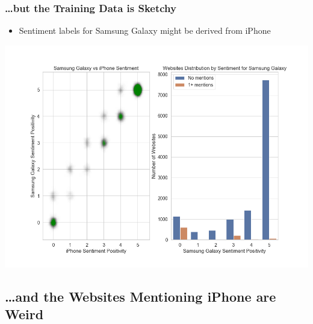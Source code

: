 \documentclass[10pt]{beamer}
\begin{document}
\begin{frame}
\frametitle{\ldots but the Training Data is Sketchy}

\begin{itemize}
    \item Sentiment labels for Samsung Galaxy might be derived from iPhone
\end{itemize}

{
    \centering
    \includegraphics[width=\textwidth,height=\textheight,keepaspectratio]{training_data_problems.png}
    \par
}

\end{frame}

\subsection{\ldots and the Websites Mentioning iPhone are Weird}
\end{document}

